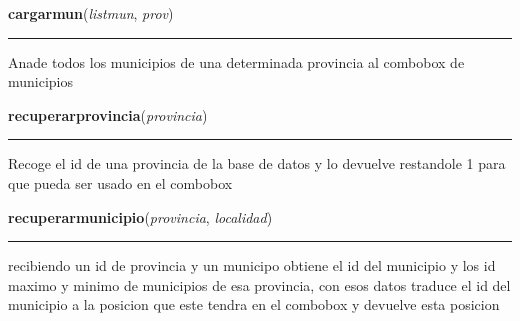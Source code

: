 \hspace{.8\funcindent}\begin{boxedminipage}{\funcwidth}

    \raggedright \textbf{cargarmun}(\textit{listmun}, \textit{prov})

    \vspace{-1.5ex}

    \rule{\textwidth}{0.5\fboxrule}
\setlength{\parskip}{2ex}
    Anade todos los municipios de una determinada provincia al combobox de 
    municipios

\setlength{\parskip}{1ex}
    \end{boxedminipage}

    \label{main:BDCA:recuperarprovincia}

    \vspace{0.5ex}

\hspace{.8\funcindent}\begin{boxedminipage}{\funcwidth}

    \raggedright \textbf{recuperarprovincia}(\textit{provincia})

    \vspace{-1.5ex}

    \rule{\textwidth}{0.5\fboxrule}
\setlength{\parskip}{2ex}
    Recoge el id de una provincia de la base de datos y lo devuelve 
    restandole 1 para que pueda ser usado en el combobox

\setlength{\parskip}{1ex}
    \end{boxedminipage}

    \label{main:BDCA:recuperarmunicipio}

    \vspace{0.5ex}

\hspace{.8\funcindent}\begin{boxedminipage}{\funcwidth}

    \raggedright \textbf{recuperarmunicipio}(\textit{provincia}, \textit{localidad})

    \vspace{-1.5ex}

    \rule{\textwidth}{0.5\fboxrule}
\setlength{\parskip}{2ex}
    recibiendo un id de provincia y un municipo obtiene el id del municipio
    y los id maximo y minimo de municipios de esa provincia, con esos datos
    traduce el id del municipio a la posicion que este tendra en el 
    combobox y devuelve esta posicion

\setlength{\parskip}{1ex}
    \end{boxedminipage}


